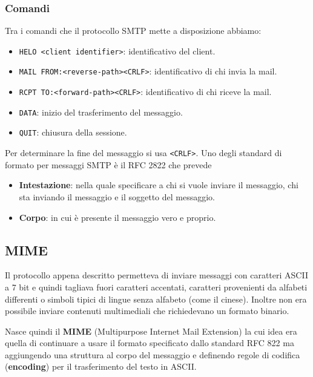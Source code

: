 \subsubsection{Comandi}
Tra i comandi che il protocollo SMTP mette a disposizione abbiamo:
\begin{itemize}
	\item \verb|HELO <client identifier>|: identificativo del client.
	\item \verb|MAIL FROM:<reverse-path><CRLF>|: identificativo di chi invia la mail.
	\item \verb|RCPT TO:<forward-path><CRLF>|: identificativo di chi riceve la mail.
	\item \verb|DATA|: inizio del trasferimento del messaggio.
	\item \verb|QUIT|: chiusura della sessione.
\end{itemize}
Per determinare la fine del messaggio si usa \verb|<CRLF>|. Uno degli standard di formato per
messaggi SMTP è il RFC 2822 che prevede
\begin{itemize}
	\item \textbf{Intestazione}: nella quale specificare a chi si vuole inviare il messaggio, chi
		sta inviando il messaggio e il soggetto del messaggio.
	\item \textbf{Corpo}: in cui è presente il messaggio vero e proprio.
\end{itemize}

\subsection{MIME}
Il protocollo appena descritto permetteva di inviare messaggi con caratteri ASCII a 7 bit e quindi
tagliava fuori caratteri accentati, caratteri provenienti da alfabeti differenti o simboli tipici
di lingue senza alfabeto (come il cinese). Inoltre non era possibile inviare contenuti multimediali
che richiedevano un formato binario.

Nasce quindi il \textbf{MIME} (Multipurpose Internet Mail Extension) la cui idea era quella di
continuare a usare il formato specificato dallo standard RFC 822 ma aggiungendo una struttura al
corpo del messaggio e definendo regole di  codifica (\textbf{encoding}) per il trasferimento del
testo in ASCII.


